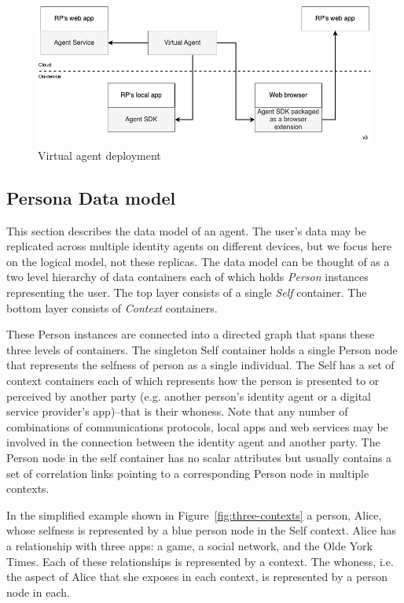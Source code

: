 \documentclass[11pt, oneside]{article}   	%
\begin{document}
\begin{figure}[htbp]
	\includegraphics[width=\textwidth]{./images/virtual-web-app.drawio.png}
	\caption{Virtual agent deployment}
	\label{fig:virtual-agent-deployment}
\end{figure}

\subsection{Persona Data model}\label{data_model_subsection} 

This section describes the data model of an agent. The user's data may be replicated across multiple identity agents on different devices, but we focus here on the logical model, not these replicas. The data model can be thought of as a two level hierarchy of data containers each of which holds \emph{Person} instances representing the user. The top layer consists of a single \emph{Self} container. The bottom layer consists of \emph{Context} containers.

These Person instances are connected into a directed graph that spans these three levels of containers. The singleton Self container holds a single Person node that represents the selfness of person as a single individual. The Self has a set of context containers each of which represents how the person is presented to or perceived by another party (e.g. another person's identity agent or a digital service provider's app)--that is their whoness. Note that any number of combinations of communications protocols, local apps and web services may be involved in the connection between the identity agent and another party. The Person node in the self container has no scalar attributes but usually contains a set of correlation links pointing to a corresponding Person node in multiple contexts.

In the simplified example shown in Figure~\ref{fig:three-contexts} a person, Alice, whose selfness is represented by a blue person node in the Self context. Alice has a relationship with three apps: a game, a social network, and the Olde York Times. Each of these relationships is represented by a context. The whoness, i.e. the aspect of Alice that she exposes in each context, is represented by a person node in each.
\end{document}

